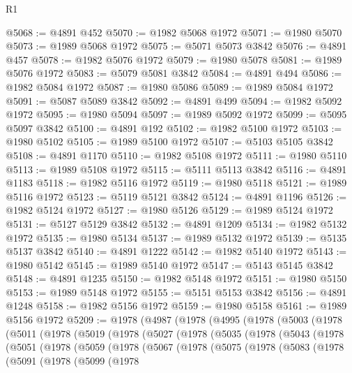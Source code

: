 \begin{lexlean}{R1}
\begin{coremodule}
@5068 := @4891 @452
@5070 := @1982 @5068 @1972
@5071 := @1980 @5070
@5073 := @1989 @5068 @1972
@5075 := @5071 @5073 @3842
@5076 := @4891 @457
@5078 := @1982 @5076 @1972
@5079 := @1980 @5078
@5081 := @1989 @5076 @1972
@5083 := @5079 @5081 @3842
@5084 := @4891 @494
@5086 := @1982 @5084 @1972
@5087 := @1980 @5086
@5089 := @1989 @5084 @1972
@5091 := @5087 @5089 @3842
@5092 := @4891 @499
@5094 := @1982 @5092 @1972
@5095 := @1980 @5094
@5097 := @1989 @5092 @1972
@5099 := @5095 @5097 @3842
@5100 := @4891 @192
@5102 := @1982 @5100 @1972
@5103 := @1980 @5102
@5105 := @1989 @5100 @1972
@5107 := @5103 @5105 @3842
@5108 := @4891 @1170
@5110 := @1982 @5108 @1972
@5111 := @1980 @5110
@5113 := @1989 @5108 @1972
@5115 := @5111 @5113 @3842
@5116 := @4891 @1183
@5118 := @1982 @5116 @1972
@5119 := @1980 @5118
@5121 := @1989 @5116 @1972
@5123 := @5119 @5121 @3842
@5124 := @4891 @1196
@5126 := @1982 @5124 @1972
@5127 := @1980 @5126
@5129 := @1989 @5124 @1972
@5131 := @5127 @5129 @3842
@5132 := @4891 @1209
@5134 := @1982 @5132 @1972
@5135 := @1980 @5134
@5137 := @1989 @5132 @1972
@5139 := @5135 @5137 @3842
@5140 := @4891 @1222
@5142 := @1982 @5140 @1972
@5143 := @1980 @5142
@5145 := @1989 @5140 @1972
@5147 := @5143 @5145 @3842
@5148 := @4891 @1235
@5150 := @1982 @5148 @1972
@5151 := @1980 @5150
@5153 := @1989 @5148 @1972
@5155 := @5151 @5153 @3842
@5156 := @4891 @1248
@5158 := @1982 @5156 @1972
@5159 := @1980 @5158
@5161 := @1989 @5156 @1972
@5209 := @1978
    (@4987
      (@1978
        (@4995
          (@1978
            (@5003
              (@1978
                (@5011
                  (@1978
                    (@5019
                      (@1978
                        (@5027
                          (@1978
                            (@5035
                              (@1978
                                (@5043
                                  (@1978
                                    (@5051
                                      (@1978
                                        (@5059
                                          (@1978
                                            (@5067
                                              (@1978
                                                (@5075
                                                  (@1978
                                                    (@5083
                                                      (@1978
                                                        (@5091
                                                          (@1978
                                                            (@5099
                                                              (@1978

\end{coremodule}
\end{lexlean}
